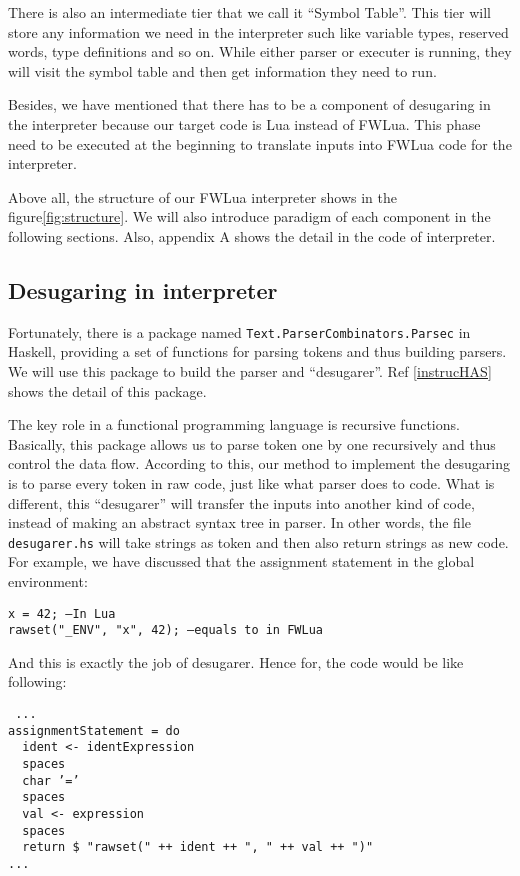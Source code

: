 \documentclass{article}
\begin{document}
There is also an intermediate tier that we call it ``Symbol Table''. This tier will store any information we need in the interpreter such like variable types, reserved words, type definitions and so on. While either parser or executer is running, they will visit the symbol table and then get information they need to run. 

Besides, we have mentioned that there has to be a component of desugaring in the interpreter because our target code is Lua instead of FWLua. This phase need to be executed at the beginning to translate inputs into FWLua code for the interpreter. 

Above all, the structure of our FWLua interpreter shows in the figure\ref {fig:structure}. We will also introduce paradigm of each component in the following sections. Also, appendix A shows the detail in the code of interpreter.

\subsection{Desugaring in interpreter}
Fortunately, there is a package named {\tt Text.ParserCombinators.Parsec} in Haskell, providing a set of functions for parsing tokens and thus building parsers. We will use this package to build the parser and ``desugarer''. Ref \ref{instrucHAS} shows the detail of this package.

The key role in a functional programming language is recursive functions. Basically, this package allows us to parse token one by one recursively and thus control the data flow. According to this, our method to implement the desugaring is to parse every token in raw code, just like what parser does to code. What is different, this ``desugarer'' will transfer the inputs into another kind of code, instead of making an abstract syntax tree in parser. In other words, the file {\tt desugarer.hs} will take strings as token and then also return strings as new code. For example, we have discussed that the assignment statement in the global environment:
\begin{flushleft}
{\tt x = 42; --In Lua\\
rawset("\_ENV", "x", 42); --equals to in FWLua\\
}
\end{flushleft}
And this is exactly the job of desugarer. Hence for, the code would be like following:
\begin{flushleft}
{\tt 
...\\
assignmentStatement = do\\
~~ident <- identExpression\\
~~spaces\\
~~char '='\\
~~spaces\\
~~val <- expression\\
~~spaces\\
~~return \$ "rawset(" ++ ident ++ ", " ++ val ++ ")"\\
...\\
}
\end{flushleft}
\end{document}
